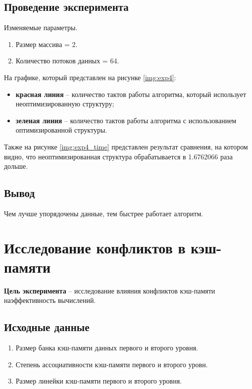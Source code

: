 \subsection{Проведение эксперимента}

Изменяемые параметры.

\begin{enumerate}
	\item Размер массива = 2.
	\item Количество потоков данных = 64.
\end{enumerate}

На графике, который представлен на рисунке \ref{img:exp4}:
\begin{itemize}
	\item \textbf{красная линия} -- количество тактов работы алгоритма, который использует неоптимизированную структуру;
	\item \textbf{зеленая линия} -- количество тактов работы алгоритма с использованием оптимизированной структуры.
\end{itemize}


%


\clearpage


Также на рисунке \ref{img:exp4_time} представлен результат сравнения, на котором видно, что неоптимизированная структура обрабатывается в 1.6762066 раза дольше.


\subsection{Вывод}

Чем лучше упорядочены данные, тем быстрее работает алгоритм.




\section{Исследование конфликтов в кэш-памяти}

\textbf{Цель эксперимента} -- исследование   влияния   конфликтов   кэш-памяти   наэффективность вычислений.

\subsection{Исходные данные}
\begin{enumerate}
	\item Размер банка кэш-памяти данных первого и второго уровня.
	\item Степень ассоциативности кэш-памяти первого и второго уровн.
	\item Размер линейки кэш-памяти первого и второго уровня.
\end{enumerate}

